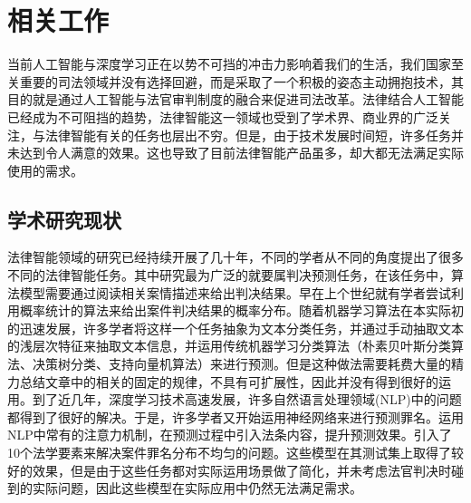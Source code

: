 \chapter{相关工作}
\label{cha:related}
当前人工智能与深度学习正在以势不可挡的冲击力影响着我们的生活，我们国家至关重要的司法领域并没有选择回避，而是采取了一个积极的姿态主动拥抱技术，其目的就是通过人工智能与法官审判制度的融合来促进司法改革。法律结合人工智能已经成为不可阻挡的趋势，法律智能这一领域也受到了学术界、商业界的广泛关注，与法律智能有关的任务也层出不穷。但是，由于技术发展时间短，许多任务并未达到令人满意的效果。这也导致了目前法律智能产品虽多，却大都无法满足实际使用的需求。


\section{学术研究现状}

法律智能领域的研究已经持续开展了几十年，不同的学者从不同的角度提出了很多不同的法律智能任务。其中研究最为广泛的就要属判决预测任务，在该任务中，算法模型需要通过阅读相关案情描述来给出判决结果。早在上个世纪就有学者尝试利用概率统计的算法来给出案件判决结果的概率分布\cite{kort1957predicting,ulmer1963quantitative,segal1984predicting}。随着机器学习算法在本实际初的迅速发展，许多学者将这样一个任务抽象为文本分类任务，并通过手动抽取文本的浅层次特征来抽取文本信息，并运用传统机器学习分类算法（朴素贝叶斯分类算法、决策树分类、支持向量机算法）来进行预测\cite{liu2006exploring,lin2012exploiting,aletras2016predicting}。但是这种做法需要耗费大量的精力总结文章中的相关的固定的规律，不具有可扩展性，因此并没有得到很好的运用。到了近几年，深度学习技术高速发展，许多自然语言处理领域(NLP)中的问题都得到了很好的解决。于是，许多学者又开始运用神经网络来进行预测罪名。\citet{luo2017learning}运用NLP中常有的注意力机制，在预测过程中引入法条内容，提升预测效果。\citet{hu2018few}引入了10个法学要素来解决案件罪名分布不均匀的问题。这些模型在其测试集上取得了较好的效果，但是由于这些任务都对实际运用场景做了简化，并未考虑法官判决时碰到的实际问题，因此这些模型在实际应用中仍然无法满足需求。


